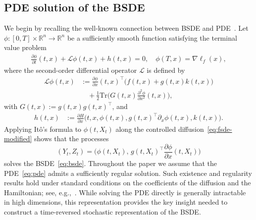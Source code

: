 \documentclass[letterpaper, 10 pt, conference]{ieeeconf}  %
\def\R{\mathbb{R}}
\def\R{\mathbb{R}}
\newcommand{\trace}{\text{Tr}}
\begin{document}
\subsection{PDE solution of the BSDE}
We begin by recalling the well-known connection between BSDE and PDE~\cite{peng1991probabilistic,ma1994solving}. Let  $\phi:[0,T]\times \R^n \to \R^n$ be a sufficiently smooth function satisfying the terminal value problem 
\begin{align}
    \frac{\partial \phi}{\partial t}(t,x) + \mathcal L \phi(t,x)  + h(t,x) 
     = 0, \quad  \phi(T,x) = \nabla \ell_f(x),\label{eq:pde}
\end{align}
where the second-order differential operator $\mathcal L$ is defined by
\begin{align*}
\mathcal L \phi (t,x)&:=  \frac{\partial \phi}{\partial x}(t,x)^\top \big(f(t,x)+g(t,x)k(t,x)\big) \\&\quad+ \frac{1}{2}\trace\big(G(t,x)\frac{\partial^2\phi}{\partial x^2}(t,x)\big),
\end{align*}
with $G(t,x):=g(t,x)g(t,x)^\top$, and
\begin{align}\label{eq:h}
h(t,x) &:=\frac{\partial H}{\partial  x}\big(t,x,\phi(t,x),g(t,x)^\top \partial_x\phi(t,x),k(t,x)\big). 
\end{align}
Applying It\^o's formula to $\phi(t,X_t)$ along the controlled diffusion~\eqref{eq:fsde-modified} shows that the processes
\begin{equation}
    (Y_t,Z_t) =  \big(\phi(t,X_t),\,g(t,X_t)^\top \frac{\partial \phi}{\partial x}(t,X_t)\big)
\end{equation}
solves the BSDE~\eqref{eq:bsde}. Throughout the paper we assume that the PDE~\eqref{eq:pde} admits a sufficiently regular solution.  
Such existence and regularity results hold under standard conditions on the coefficients of the diffusion and the Hamiltonian; see, e.g.,~\cite[Ch. 7 Sec. 4]{yong1999stochastic}. While solving the PDE directly is generally intractable in high dimensions, this representation provides the key insight needed to construct a time-reversed stochastic representation of the BSDE.
\end{document}
